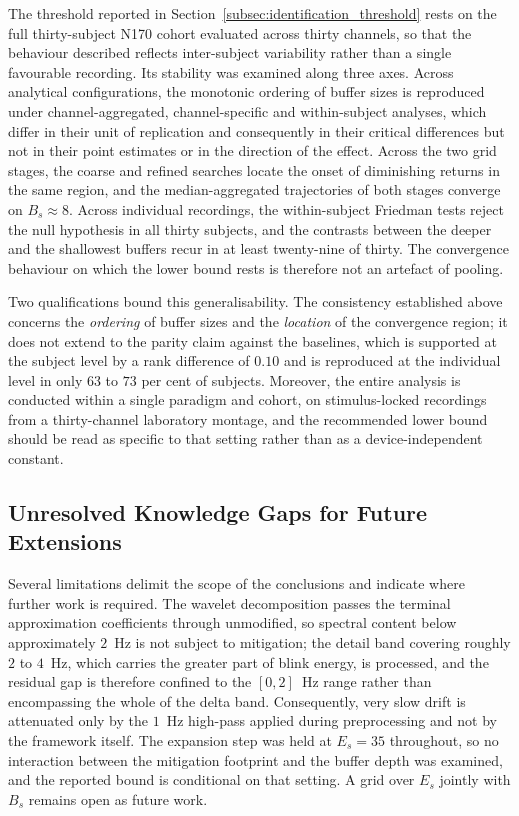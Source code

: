 \documentclass[MScCS,12pt,oneside,final]{uccthesis}
\begin{document}
The threshold reported in Section~\ref{subsec:identification_threshold} rests on the full thirty-subject N170 cohort evaluated across thirty channels, so that the behaviour described reflects inter-subject variability rather than a single favourable recording. Its stability was examined along three axes. Across analytical configurations, the monotonic ordering of buffer sizes is reproduced under channel-aggregated, channel-specific and within-subject analyses, which differ in their unit of replication and consequently in their critical differences but not in their point estimates or in the direction of the effect. Across the two grid stages, the coarse and refined searches locate the onset of diminishing returns in the same region, and the median-aggregated trajectories of both stages converge on $B_s \approx 8$. Across individual recordings, the within-subject Friedman tests reject the null hypothesis in all thirty subjects, and the contrasts between the deeper and the shallowest buffers recur in at least twenty-nine of thirty. The convergence behaviour on which the lower bound rests is therefore not an artefact of pooling.

Two qualifications bound this generalisability. The consistency established above concerns the \emph{ordering} of buffer sizes and the \emph{location} of the convergence region; it does not extend to the parity claim against the baselines, which is supported at the subject level by a rank difference of $0.10$ and is reproduced at the individual level in only $63$ to $73$ per cent of subjects. Moreover, the entire analysis is conducted within a single paradigm and cohort, on stimulus-locked recordings from a thirty-channel laboratory montage, and the recommended lower bound should be read as specific to that setting rather than as a device-independent constant. 

    \subsection{Unresolved Knowledge Gaps for Future Extensions}
    \label{subsec:unresolved_gaps}

Several limitations delimit the scope of the conclusions and indicate where further work is required. The wavelet decomposition passes the terminal approximation coefficients through unmodified, so spectral content below approximately $2$~Hz is not subject to mitigation; the detail band covering roughly $2$ to $4$~Hz, which carries the greater part of blink energy, is processed, and the residual gap is therefore confined to the $[0, 2]$~Hz range rather than encompassing the whole of the delta band. Consequently, very slow drift is attenuated only by the $1$~Hz high-pass applied during preprocessing and not by the framework itself. The expansion step was held at $E_s = 35$ throughout, so no interaction between the mitigation footprint and the buffer depth was examined, and the reported bound is conditional on that setting. A grid over $E_s$ jointly with $B_s$ remains open as future work.
\end{document}

